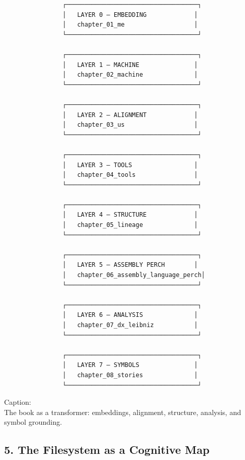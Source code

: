 \documentclass[
]{article}
\begin{document}
\begin{verbatim}
                ┌────────────────────────────────────┐
                │   LAYER 0 — EMBEDDING             │
                │   chapter_01_me                   │
                └────────────────────────────────────┘

                ┌────────────────────────────────────┐
                │   LAYER 1 — MACHINE               │
                │   chapter_02_machine              │
                └────────────────────────────────────┘

                ┌────────────────────────────────────┐
                │   LAYER 2 — ALIGNMENT             │
                │   chapter_03_us                   │
                └────────────────────────────────────┘

                ┌────────────────────────────────────┐
                │   LAYER 3 — TOOLS                 │
                │   chapter_04_tools                │
                └────────────────────────────────────┘

                ┌────────────────────────────────────┐
                │   LAYER 4 — STRUCTURE             │
                │   chapter_05_lineage              │
                └────────────────────────────────────┘

                ┌────────────────────────────────────┐
                │   LAYER 5 — ASSEMBLY PERCH        │
                │   chapter_06_assembly_language_perch│
                └────────────────────────────────────┘

                ┌────────────────────────────────────┐
                │   LAYER 6 — ANALYSIS              │
                │   chapter_07_dx_leibniz           │
                └────────────────────────────────────┘

                ┌────────────────────────────────────┐
                │   LAYER 7 — SYMBOLS               │
                │   chapter_08_stories              │
                └────────────────────────────────────┘
\end{verbatim}

Caption:\\
The book as a transformer: embeddings, alignment, structure, analysis,
and symbol grounding.

\hypertarget{the-filesystem-as-a-cognitive-map}{%
\subsection{5. The Filesystem as a Cognitive
Map}\label{the-filesystem-as-a-cognitive-map}}
\end{document}
